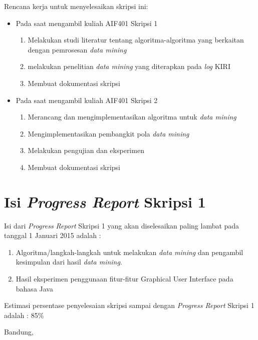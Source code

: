 \documentclass[a4paper,twoside]{article}
\begin{document}
Rencana kerja untuk menyelesaikan skripsi ini:
\begin{itemize}
	\item Pada saat mengambil kuliah AIF401 Skripsi 1
	\begin{enumerate}
		\item Melakukan studi literatur tentang algoritma-algoritma yang berkaitan dengan pemrosesan \textsl{data mining}
		\item melakukan penelitian \textsl{data mining} yang diterapkan pada \textsl{log} KIRI
		\item Membuat dokumentasi skripsi
	\end{enumerate}
	\item Pada saat mengambil kuliah AIF401 Skripsi 2
	\begin{enumerate}
		\item Merancang dan mengimplementasikan algoritma untuk \textsl{data mining}
		\item Mengimplementasikan pembangkit pola \textsl{data mining}
		\item Melakukan pengujian dan eksperimen
		\item Membuat dokumentasi skripsi
	\end{enumerate}
\end{itemize}

\section{Isi {\it Progress Report} Skripsi 1}
Isi dari {\it Progress Report} Skripsi 1 yang akan diselesaikan paling lambat pada tanggal 1 Januari 2015 adalah :
\begin{enumerate}
	\item Algoritma/langkah-langkah untuk melakukan \textsl{data mining} dan pengambil kesimpulan dari hasil \textsl{data mining}.
	\item Hasil eksperimen penggunaan fitur-fitur Graphical User Interface pada bahasa Java
\end{enumerate}
Estimasi persentase penyelesaian skripsi sampai dengan {\it Progress Report} Skripsi 1 adalah : 85\%
\vspace{1.5cm}

\centering Bandung, \tanggal\\
\vspace{2cm} \nama \\ 
\vspace{1cm}
\end{document}
